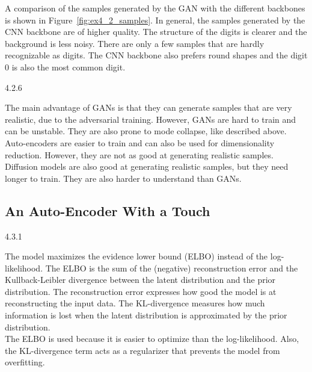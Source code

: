 A comparison of the samples generated by the GAN with the different backbones is shown in
Figure~\ref{fig:ex4_2_samples}. In general, the samples generated by the CNN backbone are of higher
quality. The structure of the digits is clearer and the background is less noisy. There are only a
few samples that are hardly recognizable as digits. The CNN backbone also prefers round shapes and
the digit $0$ is also the most common digit.


\begin{task}{4.2.6}
\end{task}

The main advantage of GANs is that they can generate samples that are very realistic, due to the
adversarial training. However, GANs are hard to train and can be unstable. They are also prone to
mode collapse, like described above. Auto-encoders are easier to train and can also be used for
dimensionality reduction. However, they are not as good at generating realistic samples. Diffusion
models are also good at generating realistic samples, but they need longer to train. They are also
harder to understand than GANs.



\subsection{An Auto-Encoder With a Touch}
\label{ex:4.3}

\begin{task}{4.3.1}
\end{task}

The model maximizes the evidence lower bound (ELBO) instead of the log-likelihood. The ELBO is the
sum of the (negative) reconstruction error and the Kullback-Leibler divergence between the latent
distribution and the prior distribution. The reconstruction error expresses how good the model is at
reconstructing the input data. The KL-divergence measures how much information is lost when the
latent distribution is approximated by the prior distribution.\\
The ELBO is used because it is easier to optimize than the log-likelihood. Also, the KL-divergence
term acts as a regularizer that prevents the model from overfitting.



